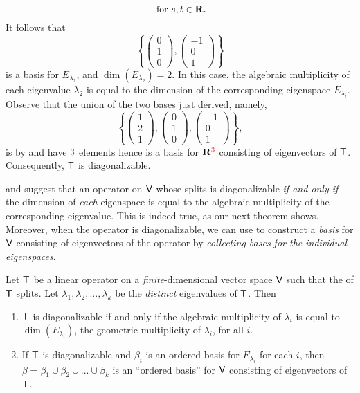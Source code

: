 \begin{example}
\[    \text { for } s, t \in \mathbf{R}.
\]
It follows that
\[
    \left\{
        \begin{pmatrix} 0 \\ 1 \\ 0 \end{pmatrix},
        \begin{pmatrix} -1 \\ 0 \\ 1 \end{pmatrix}
    \right\}
\]
is a basis for \(E_{\lambda_2}\), and \(\dim(E_{\lambda_2}) = 2\).
In this case, the algebraic multiplicity of each eigenvalue \(\lambda_2\) is equal to the dimension of the corresponding eigenspace \(E_{\lambda_i}\).
Observe that the union of the two bases just derived, namely,
\[
    \left\{
        \begin{pmatrix} 1 \\ 2 \\ 1 \end{pmatrix},
        \begin{pmatrix} 0 \\ 1 \\ 0 \end{pmatrix},
        \begin{pmatrix} -1 \\ 0 \\ 1 \end{pmatrix}
    \right\},
\]
is \LID{} by  and have \(\RED{3}\) elements hence is a basis for \(\SET{R}^{\RED{3}}\) consisting of eigenvectors of \(\textsf{T}\).
Consequently, \(\textsf{T}\) is diagonalizable.
\end{example}

 and  suggest that an operator on \(\textsf{V}\) whose \CPOLY{} splits is diagonalizable \emph{if and only if} the dimension of \emph{each} eigenspace is equal to the algebraic multiplicity of the corresponding eigenvalue.
This is indeed true, as our next theorem shows.
Moreover, when the operator is diagonalizable, we can use  to construct a \emph{basis} for \(\textsf{V}\) consisting of eigenvectors of the operator by \emph{collecting bases for the individual eigenspaces}.

\begin{theorem} \label{thm 5.8}
Let \(\textsf{T}\) be a linear operator on a \emph{finite}-dimensional vector space \(\textsf{V}\) such that the \CPOLY{} of \(\textsf{T}\) splits.
Let \(\lambda_1, \lambda_2, ..., \lambda_k\) be the \emph{distinct} eigenvalues of \(\textsf{T}\).
Then
\begin{enumerate}
\item \(\textsf{T}\) is diagonalizable if and only if the algebraic multiplicity of \(\lambda_i\) is equal to \(\dim(E_{\lambda_i})\), the geometric multiplicity of \(\lambda_i\), for all \(i\).
\item If \(\textsf{T}\) is diagonalizable and \(\beta_i\) is an ordered basis for \(E_{\lambda_i}\) for each \(i\), then \(\beta = \beta_1 \cup \beta_2 \cup ... \cup \beta_k\) is an ``ordered basis''\RED{*} for \(\textsf{V}\) consisting of eigenvectors of \(\textsf{T}\).
\end{enumerate}
\end{theorem}

